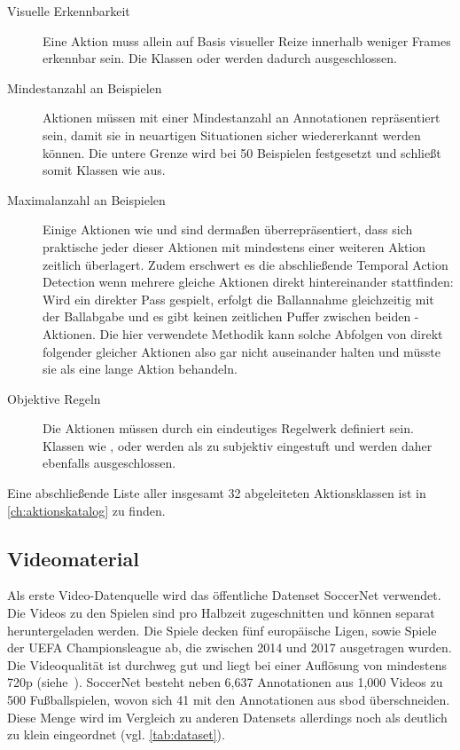 \begin{description}
    \item[Visuelle Erkennbarkeit] Eine Aktion muss allein auf Basis visueller Reize innerhalb weniger Frames erkennbar sein.
    Die Klassen  oder  werden dadurch ausgeschlossen.
    \item[Mindestanzahl an Beispielen] Aktionen müssen mit einer Mindestanzahl an Annotationen repräsentiert sein, damit sie in neuartigen Situationen sicher wiedererkannt werden können.
    Die untere Grenze wird bei 50 Beispielen festgesetzt und schließt somit Klassen wie  aus.
    \item[Maximalanzahl an Beispielen] Einige Aktionen wie  und  sind dermaßen überrepräsentiert, dass sich praktische jeder dieser Aktionen mit mindestens einer weiteren Aktion zeitlich überlagert.
    Zudem erschwert es die abschließende Temporal Action Detection wenn mehrere gleiche Aktionen direkt hintereinander stattfinden:
    Wird \zB ein direkter Pass gespielt, erfolgt die Ballannahme gleichzeitig mit der Ballabgabe und es gibt keinen zeitlichen Puffer zwischen beiden -Aktionen.
    Die hier verwendete Methodik kann solche Abfolgen von direkt folgender gleicher Aktionen also gar nicht auseinander halten und müsste sie als eine lange Aktion behandeln.
    \item[Objektive Regeln] Die Aktionen müssen durch ein eindeutiges Regelwerk definiert sein.
    Klassen wie ,  oder  werden als zu subjektiv eingestuft und werden daher ebenfalls ausgeschlossen.
\end{description}

Eine abschließende Liste aller insgesamt 32 abgeleiteten Aktionsklassen ist in \autoref{ch:aktionskatalog} zu finden.

\subsection{Videomaterial}
\label{subsec:videomaterial}

Als erste Video-Datenquelle wird das öffentliche Datenset SoccerNet verwendet.
Die Videos zu den Spielen sind pro Halbzeit zugeschnitten und können separat heruntergeladen werden.
Die Spiele decken fünf europäische Ligen, sowie Spiele der UEFA Championsleague ab, die zwischen 2014 und 2017 ausgetragen wurden.
Die Videoqualität ist durchweg gut und liegt bei einer Auflösung von mindestens 720p (siehe~\cite{SoccerNet20}).
SoccerNet besteht neben 6,637 Annotationen aus 1,000 Videos zu 500 Fußballspielen, wovon sich 41 mit den Annotationen aus \gls{sbod} überschneiden.
Diese Menge wird im Vergleich zu anderen Datensets allerdings noch als deutlich zu klein eingeordnet (vgl. \autoref{tab:dataset}).

